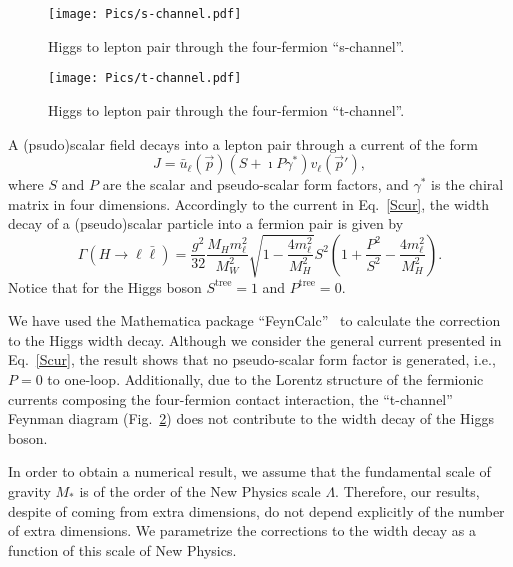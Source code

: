 \documentclass{ws-mpla}
\newcommand{\ga}{\gamma}
\renewcommand{\(}{\left(}
\renewcommand{\)}{\right)}
\renewcommand{\[}{\left[}
\renewcommand{\]}{\right]}
\begin{document}
\begin{figure}[ph]
  \begin{center}
    \texttt{[image: Pics/s-channel.pdf]}
  \end{center}
  \caption{Higgs to lepton pair through the four-fermion \mbox{``s-channel''.}}
  \label{fig:s}
\end{figure}

\begin{figure}[ph]
  \begin{center}
    \texttt{[image: Pics/t-channel.pdf]}
  \end{center}
  \caption{Higgs to lepton pair through the four-fermion \mbox{``t-channel''.}}
  \label{fig:t}
\end{figure}

A (psudo)scalar field decays into a lepton pair through a current of the form
\begin{equation}
  J = \bar{u}_\ell(\vec{p}) \( S + \imath P \ga^* \) v_\ell(\vec{p}'),
  \label{Scur}
\end{equation}
where $S$ and $P$ are the scalar and pseudo-scalar form factors, and $\ga^*$ is the chiral matrix in four dimensions. Accordingly to the current in Eq.~\eqref{Scur}, the width decay of a (pseudo)scalar particle into a fermion pair is given by 
\begin{equation}
  \Gamma(H \to \ell \bar{\ell}) = \frac{g^2}{32} \frac{M_H m_\ell^2}{M_W^2}  \sqrt{1 - \frac{4 m_\ell^2}{M_H^2} }  S^2 \( 1 + \frac{P^2}{S^2} - \frac{4 m_\ell^2}{M_H^2} \).
\end{equation}
Notice that for the Higgs boson $S^{\text{tree}} = 1$ and $P^{\text{tree}} = 0$.

We have used the Mathematica package ``FeynCalc''~\cite{Kublbeck:1992mt} to calculate the correction to the Higgs width decay. Although we consider the general current presented in Eq.~\eqref{Scur}, the result shows that no pseudo-scalar form factor is generated, i.e., $P = 0$ to one-loop. Additionally, due to the Lorentz structure of the fermionic currents composing the four-fermion contact interaction, the ``t-channel'' Feynman diagram (Fig.~\ref{fig:t}) does not contribute to the width decay of the Higgs boson.

In order to obtain a numerical result, we assume that the fundamental scale of gravity $M_*$ is of the order of the New Physics scale $\Lambda$. Therefore, our results, despite of coming from extra dimensions, do not depend explicitly of the number of extra dimensions. We parametrize the corrections to the width decay as a function of this scale of New Physics.
\end{document}
